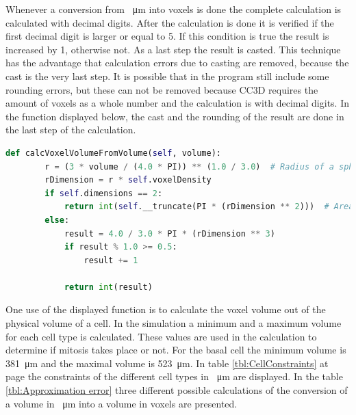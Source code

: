 Whenever a conversion from \SI{}{\micro\metre} into voxels is done the complete calculation is calculated with decimal digits. After the calculation is done it is verified if the first decimal digit is larger or equal to 5. If this condition is true the result is increased by 1, otherwise not. As a last step the result is casted. This technique has the advantage that calculation errors due to casting are removed, because the cast is the very last step. It is possible that in the program still include some rounding errors, but these can not be removed because \ac{CC3D} requires the amount of voxels as a whole number and the calculation is with decimal digits. \newline
In the function displayed below, the cast and the rounding of the result are done in the last step of the calculation.

\begin{lstlisting}[language=Python, caption = Function to calculate the volume of a sphere in voxels out of a given physical volume. First out of the given physical volume the radius is calculated. Then it is converted into the voxel unit. Next\, the volume of the voxel sphere is calculated and as last step\, the result is rounded and casted.]
   def calcVoxelVolumeFromVolume(self, volume):
        r = (3 * volume / (4.0 * PI)) ** (1.0 / 3.0)  # Radius of a sphere with known volume.
        rDimension = r * self.voxelDensity
        if self.dimensions == 2:
            return int(self.__truncate(PI * (rDimension ** 2)))  # Area of a circle.
        else:
            result = 4.0 / 3.0 * PI * (rDimension ** 3)
            if result % 1.0 >= 0.5:
                result += 1

            return int(result)
\end{lstlisting}

One use of the displayed function is to calculate the voxel volume out of the physical volume of a cell. In the simulation a minimum and a maximum volume for each cell type is calculated. These values are used in the calculation to determine if mitosis takes place or not. \newline
For the basal cell the minimum volume is \SI{381}{\micro\metre} and the maximal volume is \SI{523}{\micro\metre}. In table \ref{tbl:CellConstraints} at page \pageref{tbl:CellConstraints} the constraints of the different cell types in \SI{}{\micro\metre} are displayed. In the table \ref{tbl:Approximation error} three different possible calculations of the conversion of a volume in \SI{}{\micro\metre} into a volume in voxels are presented.

